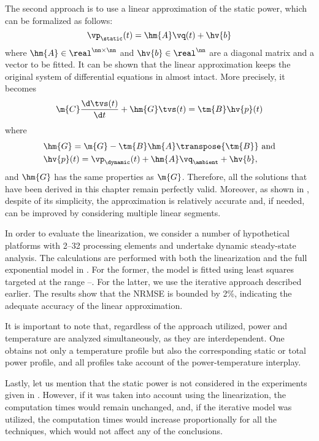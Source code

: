 The second approach is to use a linear approximation of the static power, which
can be formalized as follows:
\[
  \vp_\static(t) = \hm{A} \vq(t) + \hv{b}
\]
where $\hm{A} \in \real^{\nn \times \nn}$ and $\hv{b} \in \real^\nn$ are a
diagonal matrix and a vector to be fitted. It can be shown that the linear
approximation keeps the original system of differential equations in
 almost intact. More precisely, it
becomes
\[
  \m{C} \frac{\d \tvs(t)}{\d t} + \hm{G} \tvs(t) = \tm{B} \hv{p}(t)
\]
where
\begin{align*}
  & \hm{G} = \m{G} - \tm{B} \hm{A} \transpose{\tm{B}} \text{ and} \\
  & \hv{p}(t) = \vp_\dynamic(t) + \hm{A} \vq_\ambient + \hv{b},
\end{align*}
and $\hm{G}$ has the same properties as $\m{G}$. Therefore, all the solutions
that have been derived in this chapter remain perfectly valid. Moreover, as
shown in \cite{liu2007}, despite of its simplicity, the approximation is
relatively accurate and, if needed, can be improved by considering multiple
linear segments.

In order to evaluate the linearization, we consider a number of hypothetical
platforms with 2--32 processing elements and undertake dynamic steady-state
analysis. The calculations are performed with both the linearization and the
full exponential model in . For the former, the model is
fitted using least squares \cite{press2007} targeted at the range
--. For the latter, we use the iterative approach
described earlier. The results show that the \ac{NRMSE} is bounded by 2\%,
indicating the adequate accuracy of the linear approximation.

It is important to note that, regardless of the approach utilized, power and
temperature are analyzed simultaneously, as they are interdependent. One obtains
not only a temperature profile but also the corresponding static or total power
profile, and all profiles take account of the power-temperature interplay.

Lastly, let us mention that the static power is not considered in the
experiments given in . However, if it was taken
into account using the linearization, the computation times would remain
unchanged, and, if the iterative model was utilized, the computation times would
increase proportionally for all the techniques, which would not affect any of
the conclusions.
